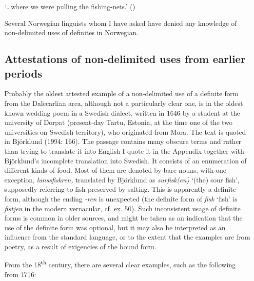 \begin{styleTranslation}
‘…where we were pulling the fishing-nets.’ (\citet[16]{Delsing2003a})

\end{styleTranslation}

\begin{styleBodyTextFirst}
Several Norwegian linguists whom I have asked have denied any knowledge of non-delimited uses of definites in Norwegian. 

\end{styleBodyTextFirst}

\subsection{\rmfamily Attestations of non-delimited uses from earlier periods}
\label{bkm:Ref154983425}
\begin{styleBodyTextFirst}
Probably the oldest attested example of a non-delimited use of a definite form from the Dalecarlian area, although not a particularly clear one, is in the oldest known wedding poem in a Swedish dialect, written in 1646 by a student at the university of Dorpat (present-day Tartu, Estonia, at the time one of the two universities on Swedish territory), who originated from Mora. The text is quoted in Björklund (1994: 166). The passage contains many obscure terms and rather than trying to translate it into English I quote it in the Appendix together with Björklund’s incomplete translation into Swedish. It consists of an enumeration of different kinds of food. Most of them are denoted by bare nouns, with one exception, \textit{lunssfiskren, }translated by Björklund as \textit{surfisk(en)} ‘(the) sour fish’, supposedly referring to fish preserved by salting. This is apparently a definite form, although the ending \textit{{}-ren} is unexpected (the definite form of \textit{fisk} ‘fish’ is \textit{fistjen} in the modern vernacular, cf. ex. 50). Such inconsistent usage of definite forms is common in older sources, and might be taken as an indication that the use of the definite form was optional, but it may also be interpreted as an influence from the standard language, or to the extent that the examples are from poetry, as a result of exigencies of the bound form. 

\end{styleBodyTextFirst}

\begin{styleBodytextC}
From the 18\textsuperscript{th} century, there are several clear examples, such as the following from 1716:

\end{styleBodytextC}

